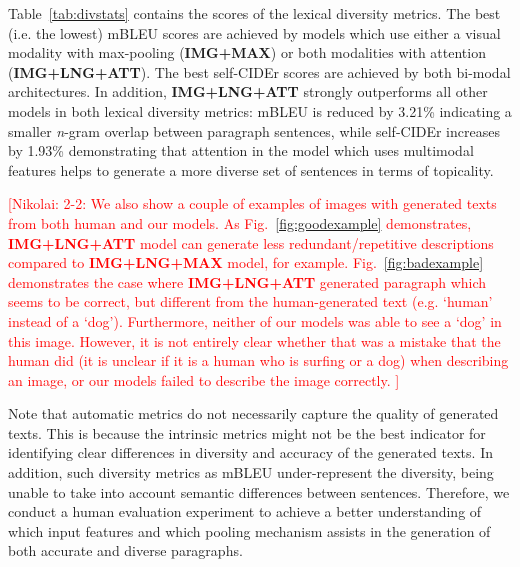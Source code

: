 \documentclass[11pt,a4paper]{article}
\newcommand{\kibitz}[2]{\ifnum\Comments=1\textcolor{#1}{#2}\fi}
\newcommand{\nikolai}[1]{\kibitz{red}  {[Nikolai: #1]}}
\begin{document}



Table~\ref{tab:divstats} contains the scores of the lexical diversity metrics. %
The best (i.e. the lowest) mBLEU scores are achieved by models which use either a visual modality with max-pooling (\textbf{IMG+MAX}) or both modalities with attention (\textbf{IMG+LNG+ATT}).
The best self-CIDEr scores are achieved by both bi-modal architectures.
In addition, \textbf{IMG+LNG+ATT} strongly outperforms all other models in both lexical diversity metrics: mBLEU is reduced by 3.21\% indicating a smaller \textit{n}-gram overlap between paragraph sentences, while self-CIDEr increases by 1.93\% demonstrating that attention in the model which uses multimodal features helps to generate a more diverse set of sentences in terms of topicality.

\nikolai{2-2:
We also show a couple of examples of images with generated texts from both human and our models.
As Fig.~\ref{fig:goodexample} demonstrates, \textbf{IMG+LNG+ATT} model can generate less redundant/repetitive descriptions compared to \textbf{IMG+LNG+MAX} model, for example.
Fig.~\ref{fig:badexample} demonstrates the case where \textbf{IMG+LNG+ATT} generated paragraph which seems to be correct, but different from the human-generated text (e.g. `human' instead of a `dog').
Furthermore, neither of our models was able to see a `dog' in this image.
However, it is not entirely clear whether that was a mistake that the human did (it is unclear if it is a human who is surfing or a dog) when describing an image, or our models failed to describe the image correctly.
}

Note that automatic metrics do not necessarily capture the quality of generated texts. %
This %
is because the intrinsic metrics might not be the best indicator for identifying clear differences in diversity and accuracy of the generated texts.
In addition, such diversity metrics as mBLEU under-represent the diversity, being unable to take into account semantic differences between sentences.
Therefore, we conduct a human evaluation experiment to achieve a better understanding of which input features and which pooling mechanism assists in the generation of both accurate and diverse paragraphs.
\end{document}
